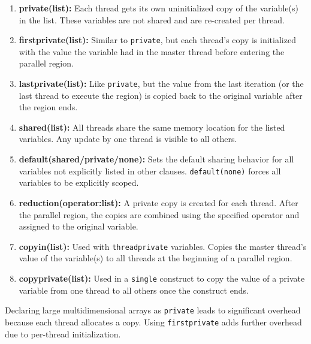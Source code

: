 \documentclass[12pt]{book}
\begin{document}
\begin{enumerate}
    \item \textbf{private(list):} Each thread gets its own uninitialized copy of the variable(s) in the list. These variables are not shared and are re-created per thread.

    \item \textbf{firstprivate(list):} Similar to \texttt{private}, but each thread's copy is initialized with the value the variable had in the master thread before entering the parallel region.

    \item \textbf{lastprivate(list):} Like \texttt{private}, but the value from the last iteration (or the last thread to execute the region) is copied back to the original variable after the region ends.

    \item \textbf{shared(list):} All threads share the same memory location for the listed variables. Any update by one thread is visible to all others.

    \item \textbf{default(shared/private/none):} Sets the default sharing behavior for all variables not explicitly listed in other clauses. \texttt{default(none)} forces all variables to be explicitly scoped.

    \item \textbf{reduction(operator:list):} A private copy is created for each thread. After the parallel region, the copies are combined using the specified operator and assigned to the original variable.

    \item \textbf{copyin(list):} Used with \texttt{threadprivate} variables. Copies the master thread's value of the variable(s) to all threads at the beginning of a parallel region.

    \item \textbf{copyprivate(list):} Used in a \texttt{single} construct to copy the value of a private variable from one thread to all others once the construct ends.
\end{enumerate}

\vspace{10pt}

Declaring large multidimensional arrays as \texttt{private} leads to significant overhead because each thread allocates a copy. Using \texttt{firstprivate} adds further overhead due to per-thread initialization.
\end{document}
